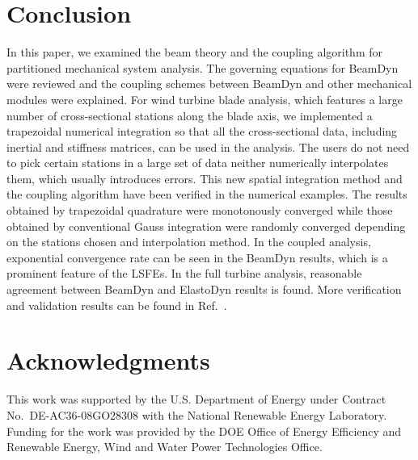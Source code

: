 \documentclass{aiaa-tc}
\begin{document}
\section{Conclusion}

In this paper, we examined the beam theory and the coupling algorithm for partitioned mechanical system analysis. The governing equations for BeamDyn were reviewed and the coupling schemes between BeamDyn and other mechanical modules were explained. For wind turbine blade analysis, which features a large number of cross-sectional stations along the blade axis, we implemented a trapezoidal numerical integration so that all the cross-sectional data, including inertial and stiffness matrices, can be used in the analysis. The users do not need to pick certain stations in a large set of data neither numerically interpolates them, which usually introduces errors. This new spatial integration method and the coupling algorithm have been verified in the numerical examples. The results obtained by trapezoidal quadrature were monotonously converged while those obtained by conventional Gauss integration were randomly converged depending on the stations chosen and interpolation method. In the coupled analysis, exponential convergence rate can be seen in the BeamDyn results, which is a prominent feature of the LSFEs. In the full turbine analysis, reasonable agreement between BeamDyn and ElastoDyn results is found. More verification and validation results can be found in  Ref.~\cite{Sri:SciTech2016}.
  
\section*{Acknowledgments} 

This work was supported by the U.S. Department of Energy under Contract No.\
DE-AC36-08GO28308 with the National Renewable Energy Laboratory. Funding for the work was provided by the DOE Office of Energy Efficiency and Renewable Energy, Wind and Water Power Technologies Office.   



\end{document}
